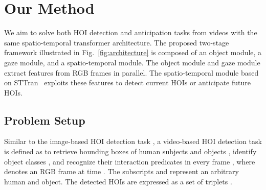 \documentclass[times,twocolumn,final,authoryear]{elsarticle}
\begin{document}
\begin{figure*}
\begin{tikzpicture}[font=\small, >={latex}]
    \end{tikzpicture}
  
    \caption{Overview of our video-based HOI detection and anticipation framework. The framework consists of three modules. The object module detects bounding boxes of humans  and objects , and recognizes object classes . An object tracker obtains human and object trajectories ( and ) in the video. Then, the human visual features , object visual features , visual relation features , and spatial relation features  are extracted through a feature backbone. In addition, a word embedding model~\citep{semantic:glove} is applied to generate semantic features  of the object class. Meanwhile, the gaze module detects heads  in RGB frames, assigns them to detected humans, and generates gaze feature maps for each human  using a gaze-following model. Next, all features in a frame are projected by an input embedding block. The human-object pair features are concatenated to a sequence of pair representations , which are refined to  by a spatial encoder. The spatial encoder also extracts a global context feature  from each frame. Then, the global features  and projected human gaze features  are concatenated to build the person-wise sliding windows of context features. Meanwhile, several instance-level sliding windows are constructed, each only containing refined pair representations of one unique human-object pair across time . A temporal encoder fuses context knowledge into the pair representations by the cross-attention mechanism. Finally, the prediction heads estimate the probability distribution  of interactions for each human-object pair based on the last occurrence  in the temporal encoder output. }
    \label{fig:architecture}
  \end{figure*}

\section{Our Method}
We aim to solve both HOI detection and anticipation tasks from videos with the same spatio-temporal transformer architecture. The proposed two-stage framework illustrated in Fig.~\ref{fig:architecture} is composed of an object module, a gaze module, and a spatio-temporal module. The object module and gaze module extract features from RGB frames in parallel. The spatio-temporal module based on STTran~\citep{hoi_v2:sttran} exploits these features to detect current HOIs or anticipate future HOIs. 

\subsection{Problem Setup}
Similar to the image-based HOI detection task \citep{hoi_i2:visual_semantic, hoi_i2:detecting_recognizing}, a video-based HOI detection task is defined as to retrieve bounding boxes of human subjects  and objects , identify object classes , and recognize their interaction predicates  in every frame , where  denotes an RGB frame at time . The subscripts  and  represent an arbitrary human and object. The detected HOIs are expressed as a set of triplets . 
\end{document}
